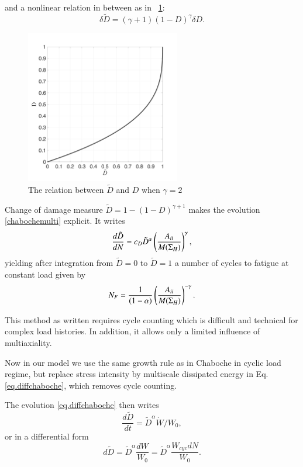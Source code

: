 \documentclass[3p,times,number,review]{elsarticle}
\newcommand{\figref}[1]{\figurename~\ref{#1}}
\begin{document}
and a nonlinear relation in between as in \figref{fig.Dhat}:
$$\delta\tilde{D}=\left(\gamma+1 \right)\left( 1-D\right)^\gamma \delta D.$$	
\begin{figure}
\centering
\includegraphics[width=0.6\textwidth]{figures//Dhat.png} 
\caption{The relation between $\tilde{D}$ and $D$ when $\gamma=2$}
\label{fig.Dhat}
\end{figure}

Change of damage measure $\tilde{D} = 1 - (1-D)^{\gamma+1}$ makes the evolution \eqref{chabochemulti} explicit. It writes
\begin{equation}
\dfrac{d\tilde{D}}{dN} = c_D {\tilde{D}}^\alpha \left(\dfrac{{A}_{\uppercase\expandafter{\romannumeral2}}}{M(\Sigma_{H})} \right) ^\gamma,
\label{eq.diffchaboche}
\end{equation}
yielding after integration from $\tilde{D}=0$ to $\tilde{D}=1$  a number of cycles to fatigue at constant load given by
$$
N_F =\dfrac{1}{(1-\alpha)}\left(\dfrac{{A}_{\uppercase\expandafter{\romannumeral2}}}{M(\Sigma_{H})} \right) ^{-\gamma}.
$$

This method as written requires cycle counting which is difficult and technical for complex load histories. In addition, it allows only a limited influence of multiaxiality.


Now in our model we use the same growth rule as in Chaboche in cyclic load regime, but replace stress intensity by multiscale dissipated energy  in Eq.\eqref{eq.diffchaboche}, which removes cycle counting.

The evolution \eqref{eq.diffchaboche} then writes
$$
\dfrac{d\tilde{D}}{dt} ={\tilde{D}}^\alpha \dot{W}/W_0,
$$
or in a differential form
\begin{equation}
d \tilde{D}=\tilde{D}^\alpha\dfrac{d W}{W_0}=\tilde{D}^\alpha\dfrac{W_{cyc}d N}{W_0}.
\label{eq.DWcyc}
\end{equation}
\end{document}
